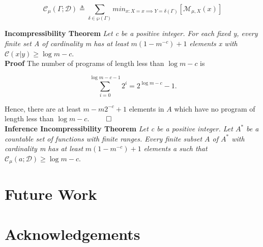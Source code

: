 \documentclass[11pt]{article}
\newcommand{\B}{\mathbb{B}}
\begin{document}
$$ \mathcal{C}_{\mu}(\Gamma ; \mathcal{D}) \triangleq \sum_{\delta \in \wp(\Gamma)} min_{x : X = x \implies Y = \delta(\Gamma) } [\mathcal{M}_{\mu, X} (x)]	$$ 

\bigskip
\textbf{Incompressibility Theorem} \quad \textit{Let c be a positive integer. For each fixed y, every finite set A of cardinality m has at least} $ m(1 - m^{-c}) + 1 $ \textit{elements x with} $ \mathcal{C}(x|y) \geq \log m - c $. \\
\textbf{Proof} \quad The number of programs of length less than $ \log m - c $ is 

$$ \sum_{i = 0}^{\log m - c - 1} {2^i} = 2^{\log m - c} - 1. $$

Hence, there are at least $ m - m2^{-c} + 1 $ elements in $ A $ which have no program of length less than $ \log m - c $. $ \hfill \qed $ \\


\bigskip
\textbf{Inference Incompressibility Theorem} \quad \textit{Let c be a positive integer. Let $ A^{*} $ be a countable set of functions with finite ranges. Every finite subset $ A $ of $ A^{*} $ with cardinality m has at least} $ m(1 - m^{-c}) + 1 $ \textit{elements a such that} $ \mathcal{C}_{\mu}(a;\mathcal{D}) \geq \log m - c $. \\


%
%
%
%
%
%
%
%



\newpage
\section{Future Work}
\newpage
\section{Acknowledgements}
\end{document}
